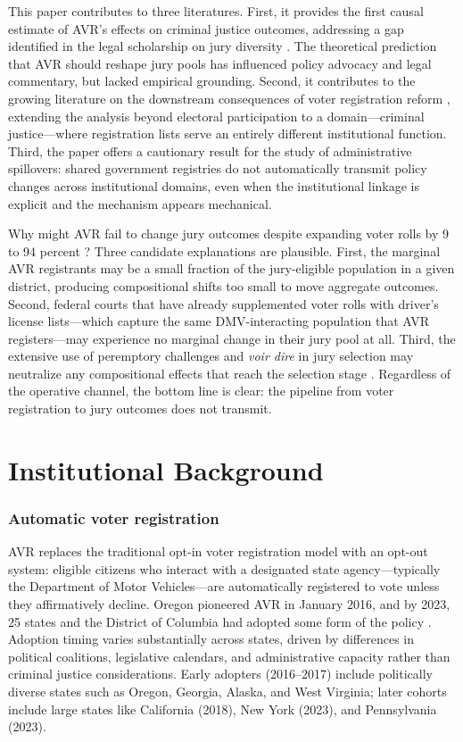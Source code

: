 \documentclass[12pt]{article}
\begin{document}
This paper contributes to three literatures. First, it provides the first causal estimate of AVR's effects on criminal justice outcomes, addressing a gap identified in the legal scholarship on jury diversity \citep{flanagan2019automatic, grosso2015racial}. The theoretical prediction that AVR should reshape jury pools has influenced policy advocacy and legal commentary, but lacked empirical grounding. Second, it contributes to the growing literature on the downstream consequences of voter registration reform \citep{cantoni2021strict, griffin2023does}, extending the analysis beyond electoral participation to a domain---criminal justice---where registration lists serve an entirely different institutional function. Third, the paper offers a cautionary result for the study of administrative spillovers: shared government registries do not automatically transmit policy changes across institutional domains, even when the institutional linkage is explicit and the mechanism appears mechanical.

Why might AVR fail to change jury outcomes despite expanding voter rolls by 9 to 94 percent \citep{brennan2023avr}? Three candidate explanations are plausible. First, the marginal AVR registrants may be a small fraction of the jury-eligible population in a given district, producing compositional shifts too small to move aggregate outcomes. Second, federal courts that have already supplemented voter rolls with driver's license lists---which capture the same DMV-interacting population that AVR registers---may experience no marginal change in their jury pool at all. Third, the extensive use of peremptory challenges and \textit{voir dire} in jury selection may neutralize any compositional effects that reach the selection stage \citep{diamond2009jury, hans2007twelve}. Regardless of the operative channel, the bottom line is clear: the pipeline from voter registration to jury outcomes does not transmit.

\section{Institutional Background}

\subsubsection*{Automatic voter registration} AVR replaces the traditional opt-in voter registration model with an opt-out system: eligible citizens who interact with a designated state agency---typically the Department of Motor Vehicles---are automatically registered to vote unless they affirmatively decline. Oregon pioneered AVR in January 2016, and by 2023, 25 states and the District of Columbia had adopted some form of the policy \citep{brennan2023avr}. Adoption timing varies substantially across states, driven by differences in political coalitions, legislative calendars, and administrative capacity rather than criminal justice considerations. Early adopters (2016--2017) include politically diverse states such as Oregon, Georgia, Alaska, and West Virginia; later cohorts include large states like California (2018), New York (2023), and Pennsylvania (2023).
\end{document}

